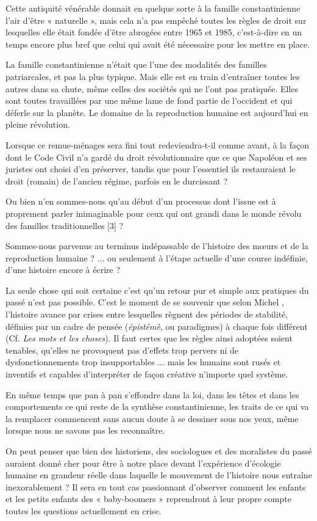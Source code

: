  Cette antiquité vénérable donnait en quelque sorte à la famille constantinienne l'air d'être « naturelle », mais cela n'a pas empêché toutes les règles de droit sur lesquelles elle était fondée d'être abrogées entre 1965 et 1985, c'est-à-dire en un temps encore plus bref que celui qui avait été nécessaire pour les mettre en place. 
 
 La famille constantinienne n'était que l'une des modalités des familles patriarcales, et pas la plus typique. Mais elle est en train d'entraîner toutes les autres dans sa chute, même celles des sociétés qui ne l'ont pas pratiquée. Elles sont toutes travaillées par une même lame de fond partie de l'occident et qui déferle sur la planète. Le domaine de la reproduction humaine est aujourd'hui en pleine révolution.
  
 Lorsque ce remue-ménages sera fini tout redeviendra-t-il comme avant, à la façon dont le Code Civil n'a gardé du droit révolutionnaire que ce que Napoléon et ses juristes ont choisi d'en préserver, tandis que pour l'essentiel ils restauraient le droit (romain) de l'ancien régime, parfois en le durcissant ? 
 
 Ou bien n'en sommes-nous qu'au début d'un processus dont l'issue est à proprement parler inimaginable pour ceux qui ont grandi dans le monde révolu des familles traditionnelles%
 [3]%
%
 ?

 Sommes-nous parvenus au terminus indépassable de l'histoire des mœurs et de la reproduction humaine ? ... ou seulement à l'étape actuelle d'une course indéfinie, d'une histoire encore à écrire ? 
 
 La seule chose qui soit certaine c'est qu'un retour pur et simple aux pratiques du passé n'est pas possible. C'est le moment de se souvenir que selon Michel , l'histoire avance par crises entre lesquelles règnent des périodes de stabilité, définies par un cadre de pensée (\emph{épistémè}, ou paradigmes) à chaque fois différent (Cf. \emph{Les mots et les choses}). Il faut certes que les règles ainsi adoptées soient tenables, qu'elles ne provoquent pas d'effets trop pervers ni de dysfonctionnements trop insupportables ... mais les humains sont rusés et inventifs et capables d'interpréter de façon créative n'importe quel système.

 En même temps que pan à pan s'effondre dans la loi, dans les têtes et dans les comportements ce qui reste de la synthèse constantinienne, les traits de ce qui va la remplacer commencent sans aucun doute à se dessiner sous nos yeux, même lorsque nous ne savons pas les reconnaître.

On peut penser que bien des historiens, des sociologues et des moralistes du passé auraient donné cher pour être à notre place devant l'expérience d'écologie humaine en grandeur réelle dans laquelle le mouvement de l'histoire nous entraîne inexorablement ? Il sera en tout cas passionnant d'observer comment les enfants et les petits enfants des « baby-boomers » reprendront à leur propre compte toutes les questions actuellement en crise.

